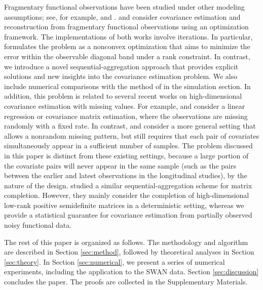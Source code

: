 \documentclass[11pt]{article}
\newcommand{\0}{{\mathbf{0}}}
\newcommand{\1}{{\mathbf{1}}}
\begin{document}
Fragmentary functional observations have been studied under other modeling assumptions; see, for example, \cite{delaigle2013classification} and \cite{delaigle2016approximating}.  \cite{descary2017recovering} and \cite{kneip2017optimal} consider covariance estimation and reconstruction from fragmentary functional observations using an optimization framework. The implementations of both works involve iterations. In particular, \cite{descary2017recovering} formulates the problem as a nonconvex optimization that aims to minimize the error within the observable diagonal band under a rank constraint. In contrast, we introduce a novel sequential-aggregation approach that provides explicit solutions and new insights into the covariance estimation problem. We also include numerical comparisons with the method of \cite{descary2017recovering} in the simulation section. In addition, this problem is related to several recent works on high-dimensional covariance estimation with missing values. For example, \cite{loh2012high} and \cite{lounici2014high} consider a linear regression or covariance matrix estimation, where the observations are missing randomly with a fixed rate. In contrast, \cite{kolar2012consistent} and \cite{cai2016minimax} consider a more general setting that allows a nonrandom missing pattern, but still requires that each pair of covariates simultaneously appear in a sufficient number of samples. 
The problem discussed in this paper is distinct from these existing settings, because a large portion of the covariate pairs will never appear in the same sample (such as the pairs between the earlier and latest observations in the longitudinal studies), by the nature of the design. \cite{bishop2014deterministic} studied a similar sequential-aggregation scheme for matrix completion. However, they mainly consider the completion of high-dimensional low-rank positive semidefinite matrices in a deterministic setting, whereas we provide a statistical guarantee for covariance estimation from partially observed noisy functional data. 



The rest of this paper is organized as follows. The methodology and algorithm are described in Section \ref{sec:method}, followed by theoretical analyses in Section \ref{sec:theory}. In Section \ref{sec:numerical}, we present a series of numerical experiments, including the application to the SWAN data. Section \ref{sec:discussion} concludes the paper. The proofs are collected in the Supplementary Materials.

\end{document}
